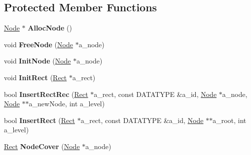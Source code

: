 \subsection*{\-Protected \-Member \-Functions}
\begin{DoxyCompactItemize}
\item 
\hypertarget{class_r_tree_af118b3fc992c88a61fb2e1ebc0c96fc9}{\hyperlink{struct_r_tree_1_1_node}{\-Node} $\ast$ {\bfseries \-Alloc\-Node} ()}\label{class_r_tree_af118b3fc992c88a61fb2e1ebc0c96fc9}

\item 
\hypertarget{class_r_tree_a6b5438d9cb74dbfc63f3bfff275f506b}{void {\bfseries \-Free\-Node} (\hyperlink{struct_r_tree_1_1_node}{\-Node} $\ast$a\-\_\-node)}\label{class_r_tree_a6b5438d9cb74dbfc63f3bfff275f506b}

\item 
\hypertarget{class_r_tree_aa24d93770aaa1042136daeabfdb8de3e}{void {\bfseries \-Init\-Node} (\hyperlink{struct_r_tree_1_1_node}{\-Node} $\ast$a\-\_\-node)}\label{class_r_tree_aa24d93770aaa1042136daeabfdb8de3e}

\item 
\hypertarget{class_r_tree_aa065e71784e5cac81acd16c07c6abe5e}{void {\bfseries \-Init\-Rect} (\hyperlink{struct_r_tree_1_1_rect}{\-Rect} $\ast$a\-\_\-rect)}\label{class_r_tree_aa065e71784e5cac81acd16c07c6abe5e}

\item 
\hypertarget{class_r_tree_a534acb51413cea9ba14cdf6de955a063}{bool {\bfseries \-Insert\-Rect\-Rec} (\hyperlink{struct_r_tree_1_1_rect}{\-Rect} $\ast$a\-\_\-rect, const \-D\-A\-T\-A\-T\-Y\-P\-E \&a\-\_\-id, \hyperlink{struct_r_tree_1_1_node}{\-Node} $\ast$a\-\_\-node, \hyperlink{struct_r_tree_1_1_node}{\-Node} $\ast$$\ast$a\-\_\-new\-Node, int a\-\_\-level)}\label{class_r_tree_a534acb51413cea9ba14cdf6de955a063}

\item 
\hypertarget{class_r_tree_a0539c68da4aec2165a14ee2c93fab028}{bool {\bfseries \-Insert\-Rect} (\hyperlink{struct_r_tree_1_1_rect}{\-Rect} $\ast$a\-\_\-rect, const \-D\-A\-T\-A\-T\-Y\-P\-E \&a\-\_\-id, \hyperlink{struct_r_tree_1_1_node}{\-Node} $\ast$$\ast$a\-\_\-root, int a\-\_\-level)}\label{class_r_tree_a0539c68da4aec2165a14ee2c93fab028}

\item 
\hypertarget{class_r_tree_a19dc96034d7a3230ba877953247457e1}{\hyperlink{struct_r_tree_1_1_rect}{\-Rect} {\bfseries \-Node\-Cover} (\hyperlink{struct_r_tree_1_1_node}{\-Node} $\ast$a\-\_\-node)}\label{class_r_tree_a19dc96034d7a3230ba877953247457e1}


\end{DoxyCompactItemize}
